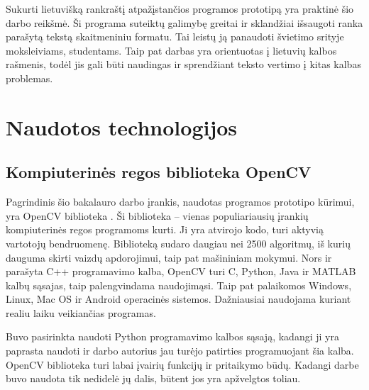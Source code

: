 \documentclass[a4paper,12pt]{article}
\begin{document}
Sukurti lietuvišką rankraštį atpažįstančios programos prototipą yra praktinė šio darbo reikšmė. Ši programa suteiktų galimybę greitai ir sklandžiai išsaugoti ranka parašytą tekstą skaitmeniniu formatu. Tai leistų ją panaudoti švietimo srityje moksleiviams, studentams. Taip pat darbas yra orientuotas į lietuvių kalbos rašmenis, todėl jis gali būti naudingas ir sprendžiant teksto vertimo į kitas kalbas problemas.

\clearpage

\section{Naudotos technologijos}
\subsection{Kompiuterinės regos biblioteka OpenCV}
Pagrindinis šio bakalauro darbo įrankis, naudotas programos prototipo kūrimui, yra OpenCV biblioteka \cite{CVWEB}. Ši biblioteka – vienas populiariausių įrankių kompiuterinės regos programoms kurti. Ji yra atvirojo kodo, turi aktyvią vartotojų bendruomenę. Biblioteką sudaro daugiau nei 2500 algoritmų, iš kurių dauguma skirti vaizdų apdorojimui, taip pat mašininiam mokymui. Nors ir parašyta C++ programavimo kalba, OpenCV turi C, Python, Java ir MATLAB kalbų sąsajas, taip palengvindama naudojimąsi. Taip pat palaikomos Windows, Linux, Mac OS ir Android operacinės sistemos. Dažniausiai naudojama kuriant realiu laiku veikiančias programas.

Buvo pasirinkta naudoti Python programavimo kalbos sąsają, kadangi ji yra paprasta naudoti ir darbo autorius jau turėjo patirties programuojant šia kalba. OpenCV biblioteka turi labai įvairių funkcijų ir pritaikymo būdų. Kadangi darbe buvo naudota tik nedidelė jų dalis, būtent jos yra apžvelgtos toliau.
\end{document}
